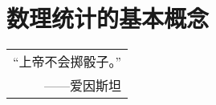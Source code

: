\chapter{数理统计的基本概念}%

\begin{flushright}
    \begin{tabular}{r|||}
        “上帝不会掷骰子。”\\
        ——爱因斯坦
    \end{tabular}
\end{flushright}



